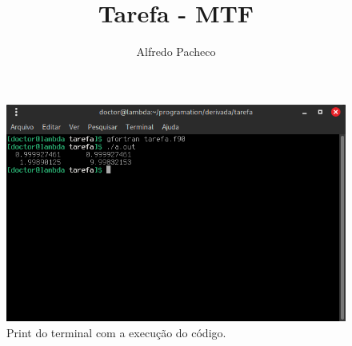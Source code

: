 \documentclass[11pt,a4paper]{article}
\author{Alfredo Pacheco}
\title{Tarefa - MTF}
\date{}
\begin{document}
\maketitle


\begin{figure}[p]
\centering
\includegraphics[width=\linewidth]{print.png}
\caption{Print do terminal com a execução do código.}
\end{figure}
\end{document}
